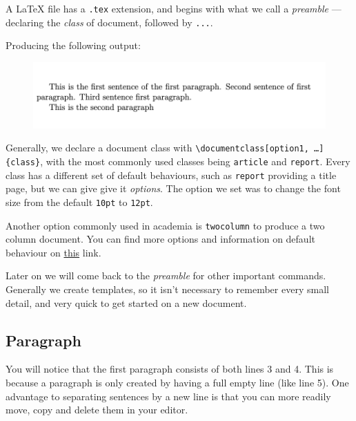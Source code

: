 A LaTeX file has a \verb|.tex| extension, and begins with what we call a \emph{preamble} --- declaring the \emph{class} of document, followed by \verb|...|.


Producing the following output:

\begin{figure}[h]
    \centering
    \includegraphics[width=\textwidth]{figures/chapters.png}
    \label{fig:chapters}
\end{figure}

Generally, we declare a document class with \texttt{\textbackslash documentclass[option1, \ldots]\{class\}}, with the most commonly used classes being \verb|article| and \verb|report|.
Every class has a different set of default behaviours, such as \verb|report| providing a title page, but we can give give it \emph{options}.
The option we set was to change the font size from the default \verb|10pt| to \verb|12pt|.

Another option commonly used in academia is \verb|twocolumn| to produce a two column document.
You can find more options and information on default behaviour on \href{https://texblog.org/2013/02/13/latex-documentclass-options-illustrated/}{this} link.

Later on we will come back to the \emph{preamble} for other important commands.
Generally we create templates, so it isn't necessary to remember every small detail, and very quick to get started on a new document.

\subsection{Paragraph}

You will notice that the first paragraph consists of both lines 3 and 4.
This is because a paragraph is only created by having a full empty line (like line 5).
One advantage to separating sentences by a new line is that you can more readily move, copy and delete them in your editor.

